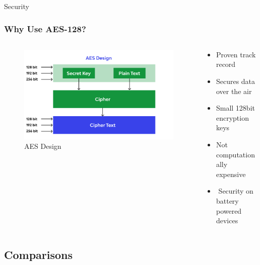 \documentclass{beamer}
\begin{document}
  \begin{frame}{Security}
    \frametitle{Why Use AES-128?}
    \begin{columns}
      \begin{column}{0.5\textwidth}
        \begin{figure}[htbp]
          \centering
          \includegraphics[width=\textwidth]{AES128_structure.png}
          \caption{AES Design \cite{Beschokov}}
          \label{fig:AES_Design}
        \end{figure}
      \end{column}
      \begin{column}{0.5\textwidth}
        \begin{itemize}
          \item Proven track record
          \item Secures data over the air
          \item Small 128bit encryption keys
          \item Not computationally expensive
          \item \faThumbsOUp$ $ Security on battery powered devices
        \end{itemize}
      \end{column}
    \end{columns}
  \end{frame}

\subsection{Comparisons}
\end{document}
